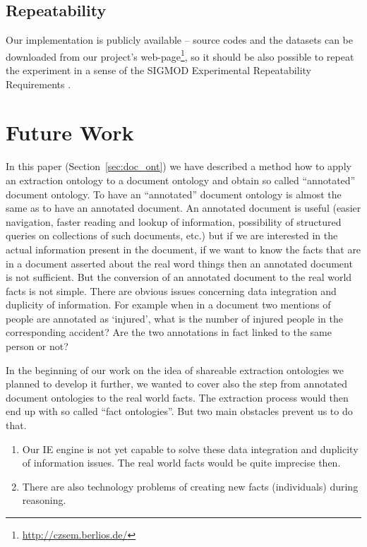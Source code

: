 \subsection{Repeatability}

Our implementation is publicly available -- source codes and the datasets can be downloaded from our project's web-page\footnote{\url{http://czsem.berlios.de/}}, so it should be also possible to repeat the experiment in a sense of  the SIGMOD Experimental Repeatability Requirements \citep{biblio:SIGMODrepeatability}.

\section{Future Work}


In this paper (Section~\ref{sec:doc_ont}) we have described a method how to apply an extraction ontology to a document ontology and obtain so called ``annotated'' document ontology. To have an ``annotated'' document ontology is almost the same as to have an annotated document. An annotated document is useful (easier navigation, faster reading and lookup of information, possibility of structured queries on collections of such documents, etc.) but if we are interested in the actual information present in the document, if we want to know the facts that are in a document asserted about the real word things then an annotated document is not sufficient. But the conversion of an annotated document to the real world facts is not simple.
There are obvious issues concerning data integration and duplicity of information. For example when in a document two mentions of people are annotated as `injured', what is the number of injured people in the corresponding accident? Are the two annotations in fact linked to the same person or not?

In the beginning of our work on the idea of shareable extraction ontologies we planned to develop it further, we wanted to cover also the step from annotated document ontologies to the real world facts. The extraction process would then end up with so called ``fact ontologies''. But two main obstacles prevent us to do that.

\begin{enumerate}
	\item Our IE engine is not yet capable to solve these data integration and duplicity of information issues. The real world facts would be quite imprecise then.
	\item There are also technology problems of creating new facts (individuals) during reasoning.
\end{enumerate}

